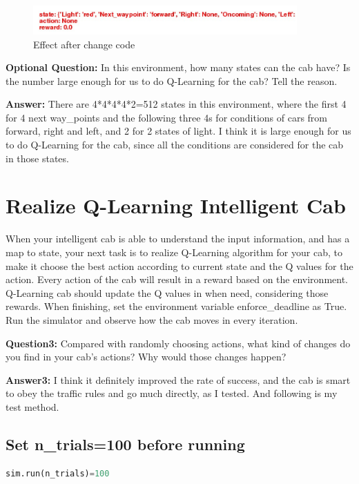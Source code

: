 \documentclass[11pt,a4paper]{article}
\begin{document}
\begin{figure}[htbp]
  \centering
  \includegraphics[width=0.9\textwidth]{effect.jpg}
  \caption{Effect after change code}\label{fig:digit}
\end{figure}

\vspace{3mm}
\noindent \textbf{Optional Question:} In this environment, how many states can the cab have? Is the number large enough for us to do Q-Learning for the cab? Tell the reason.

\vspace{3mm}
\noindent \textbf{Answer:} There are 4*4*4*4*2=512 states in this environment, where the first 4 for 4 next way\_points and the following three 4s for conditions of cars from forward, right and left, and 2 for 2 states of light. I think it is large enough for us to do Q-Learning for the cab, since all the conditions are considered for the cab in those states.

\section{Realize Q-Learning Intelligent Cab}
When your intelligent cab is able to understand the input information, and has a map to state, your next task is to realize Q-Learning algorithm for your cab, to make it choose the best action according to current state and the Q values for the action. Every action of the cab will result in a reward based on the environment. Q-Learning cab should update the Q values in when need, considering those rewards. When finishing, set the environment variable enforce\_deadline as True. Run the simulator and observe how the cab moves in every iteration. 

\vspace{3mm}
\noindent \textbf{Question3:}  Compared with randomly choosing actions, what kind of changes do you find in your cab’s actions? Why would those changes happen?

\vspace{3mm}
\noindent \textbf{Answer3:} I think it definitely improved the rate of success, and the cab is smart to obey the traffic rules and go much directly, as I tested. And following is my test method.


\subsection {Set n\_trials=100 before running}
\begin{lstlisting}[language={Python}]
sim.run(n_trials)=100
\end{lstlisting}
\end{document}
